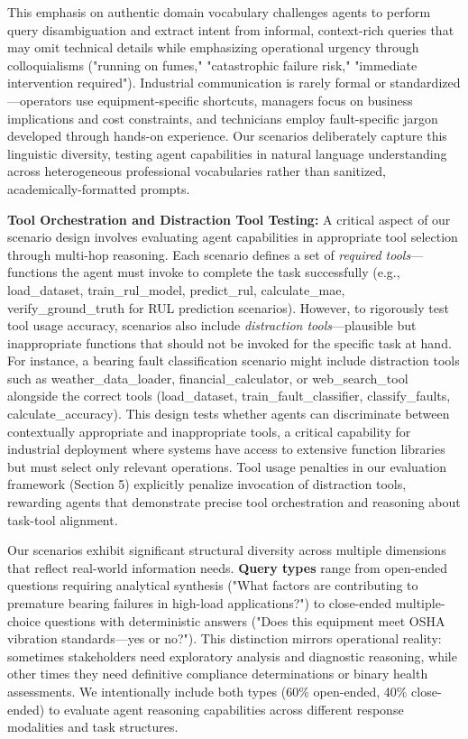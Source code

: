 \documentclass[sigconf]{acmart}
\begin{document}
This emphasis on authentic domain vocabulary challenges agents to perform query disambiguation and extract intent from informal, context-rich queries that may omit technical details while emphasizing operational urgency through colloquialisms ("running on fumes," "catastrophic failure risk," "immediate intervention required"). Industrial communication is rarely formal or standardized---operators use equipment-specific shortcuts, managers focus on business implications and cost constraints, and technicians employ fault-specific jargon developed through hands-on experience. Our scenarios deliberately capture this linguistic diversity, testing agent capabilities in natural language understanding across heterogeneous professional vocabularies rather than sanitized, academically-formatted prompts.

\textbf{Tool Orchestration and Distraction Tool Testing:} A critical aspect of our scenario design involves evaluating agent capabilities in appropriate tool selection through multi-hop reasoning. Each scenario defines a set of \textit{required tools}---functions the agent must invoke to complete the task successfully (e.g., load\_dataset, train\_rul\_model, predict\_rul, calculate\_mae, verify\_ground\_truth for RUL prediction scenarios). However, to rigorously test tool usage accuracy, scenarios also include \textit{distraction tools}---plausible but inappropriate functions that should not be invoked for the specific task at hand. For instance, a bearing fault classification scenario might include distraction tools such as weather\_data\_loader, financial\_calculator, or web\_search\_tool alongside the correct tools (load\_dataset, train\_fault\_classifier, classify\_faults, calculate\_accuracy). This design tests whether agents can discriminate between contextually appropriate and inappropriate tools, a critical capability for industrial deployment where systems have access to extensive function libraries but must select only relevant operations. Tool usage penalties in our evaluation framework (Section 5) explicitly penalize invocation of distraction tools, rewarding agents that demonstrate precise tool orchestration and reasoning about task-tool alignment.

Our scenarios exhibit significant structural diversity across multiple dimensions that reflect real-world information needs. \textbf{Query types} range from open-ended questions requiring analytical synthesis ("What factors are contributing to premature bearing failures in high-load applications?") to close-ended multiple-choice questions with deterministic answers ("Does this equipment meet OSHA vibration standards---yes or no?"). This distinction mirrors operational reality: sometimes stakeholders need exploratory analysis and diagnostic reasoning, while other times they need definitive compliance determinations or binary health assessments. We intentionally include both types (60\% open-ended, 40\% close-ended) to evaluate agent reasoning capabilities across different response modalities and task structures.
\end{document}
